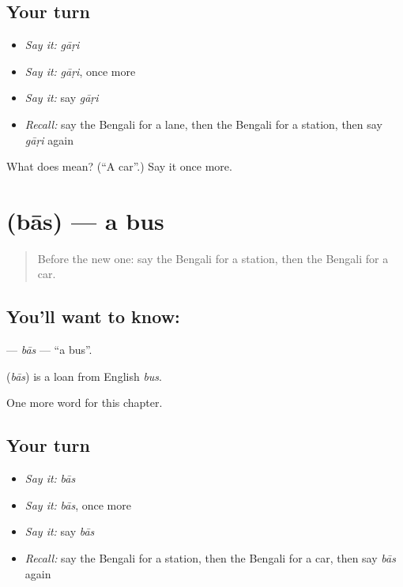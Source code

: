 \subsection*{Your turn}
\begin{itemize}
\raggedright
  \item \emph{Say it:} \emph{gāṛi}
  \item \emph{Say it:} \emph{gāṛi}, once more
  \item \emph{Say it:} say \emph{gāṛi}
  \item \emph{Recall:} say the Bengali for a lane, then the Bengali for a station, then say \emph{gāṛi} again
\end{itemize}

\begin{tcolorbox}[breakable,colback=teal!4,colframe=teal!35!black,title={Before you move on}]
What does  mean? (\textquotedblleft{}A car\textquotedblright{}.) Say it once more.
\end{tcolorbox}
\section[\texorpdfstring{\bn{বাস} (bās)}{বাস (bās)}]{ (bās) — a bus}

\label{lesson:BN-C83-bas}



\begin{quote}
Before the new one: say the Bengali for a station, then the Bengali for a car.
\end{quote}

\subsection*{You'll want to know: }
\textbf{} — \emph{bās} — \textquotedblleft{}a bus\textquotedblright{}.

\begin{cousinweb}
\textbf{} (\emph{bās}) is a loan from English \emph{bus}.
\end{cousinweb}

\begin{grammarlens}[title={What you've built}]
One more word for this chapter.
\end{grammarlens}

\subsection*{Your turn}
\begin{itemize}
\raggedright
  \item \emph{Say it:} \emph{bās}
  \item \emph{Say it:} \emph{bās}, once more
  \item \emph{Say it:} say \emph{bās}
  \item \emph{Recall:} say the Bengali for a station, then the Bengali for a car, then say \emph{bās} again
\end{itemize}

